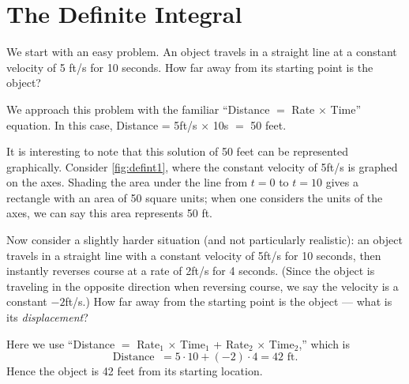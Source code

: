 \section{The Definite Integral}\label{sec:def_int}

We start with an easy problem. An object travels in a straight line at a constant velocity of 5 ft/s for 10 seconds. How far away from its starting point is the object?

We approach this problem with the familiar ``Distance $=$ Rate $\times$ Time'' equation. In this case, Distance = 5ft/s $\times$ 10s $=$ 50 feet.

It is interesting to note that this solution of 50 feet can be represented graphically. Consider \autoref{fig:defint1}, where the constant velocity of 5ft/s is graphed on the axes. Shading the area under the line from $t=0$ to $t=10$ gives a rectangle with an area of 50 square units; when one considers the units of the axes, we can say this area represents 50 ft.


Now consider a slightly harder situation (and not particularly realistic): an object travels in a straight line with a constant velocity of 5ft/s for 10 seconds, then instantly reverses course at a rate of 2ft/s for 4 seconds. (Since the object is traveling in the opposite direction when reversing course, we say the velocity is a constant $-2$ft/s.) How far away from the starting point is the object --- what is its \textit{displacement}?

Here we use ``Distance $=$ Rate$_1$ $\times$ Time$_1$ + Rate$_2$ $\times$ Time$_2$,'' which is 
\[\text{Distance } \ = 5\cdot10 + (-2)\cdot 4 = 42\text{ ft.}\]
Hence the object is 42 feet from its starting location.

